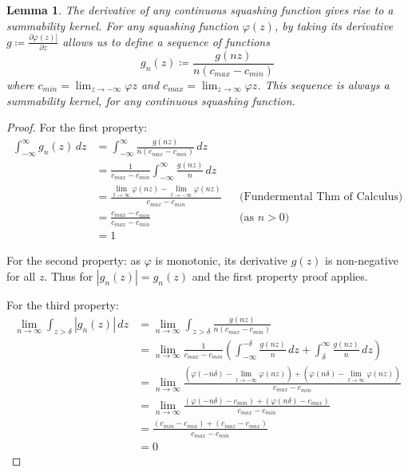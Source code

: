\documentclass{article} %
\newtheorem{lem}[thm]{Lemma}
\newcommand{\dlim}{\displaystyle\lim}
\begin{document}
\begin{lem}{The derivative of any continuous squashing function gives rise to a summability kernel.}
	For any squashing function $\varphi(z)$,
	by taking its derivative $g \coloneqq \frac{\partial\varphi(z)]}{\partial z}$ allows us to define a sequence of functions 
	\begin{equation}
	g_n(z) \coloneqq \frac{g(nz)}{n\left( c_{max} - c_{min} \right)} 
	\end{equation}
	 where $c_{min}=\lim_{z \to -\infty} \varphi{z}$ and $c_{max}=\lim_{z \to \infty} \varphi{z}$.
	This sequence is always a summability kernel, for any continuous squashing function.
	

\end{lem}
\begin{proof}
For the first property:
\begin{align}
	\int_{-\infty}^{\infty} g_n(z) \, dz &=  \int_{-\infty}^{\infty} \frac{g(nz)}{n\left( c_{max} - c_{min} \right)} \, dz \\
	&= \frac{1}{c_{max} - c_{min}} \int_{-\infty}^{\infty} \frac{g(nz)}{n} \, dz \\
	&= \frac{\dlim_{t \to \infty} \varphi(nz) - \dlim_{t \to -\infty} \varphi(nz)}{c_{max} - c_{min}} && \text{(Fundermental Thm of Calculus)}\\
	&= \frac{c_{max} - c_{min}}{c_{max} - c_{min}}  && \text{(as $n>0$)}\\
	&= 1	
\end{align}
	
For the second property: as  $\varphi$ is monotonic, its derivative $g(z)$ is non-negative for all $z$. Thus for $|g_n(z)|=g_n(z)$ and the first property proof applies.

For the third property:
\begin{align}
	\lim_{n\to\infty} \int_{z>\delta} |g_n(z)|\, dz &= \lim_{n\to\infty} \int_{z>\delta} \frac{g(nz)}{n\left( c_{max} - c_{min} \right)} \\
	 &= \lim_{n\to\infty} \frac{1}{c_{max} - c_{min}} 
		 \left( \int_{-\infty}^{-\delta} \frac{g(nz)}{n} \, dz 
		 + \int_\delta^\infty \frac{g(nz)}{n} \, dz \right) \\
	 &= \lim_{n\to\infty} \frac{
	 	\left(\varphi(-n\delta)-\dlim_{t \to -\infty} \varphi(nz)\right)
	 	 + \left( \varphi(n\delta) - \dlim_{t \to \infty} \varphi(nz)\right)}%
	 	 {c_{max} - c_{min}} \\
	 &= \lim_{n\to\infty} \frac{
	 	\left(\varphi(-n\delta)-c_{min} \right)
	 	+ \left( \varphi(n\delta) - c_{max} \right)}%
	    {c_{max} - c_{min}} \\
	 &= \frac{
	 	\left(c_{min}-c_{min} \right)
	 	+ \left(c_{max} - c_{max} \right)}%
		{c_{max} - c_{min}} \\
	 &= 0
\end{align}


\end{proof}
\end{document}
